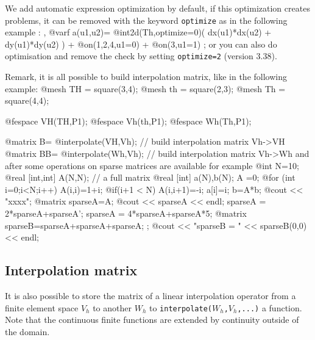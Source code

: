 \documentclass[a4paper,twoside,12pt]{book}
\def\x#1{#1\index{#1}}%
\def\n{\nabla}
\begin{document}
We add automatic \x{expression optimization} by default, if this optimization creates problems,
it can be removed with the keyword \texttt{{optimize}} as in the following example : ,
\bFF
@varf a(u1,u2)= @int2d(Th,optimize=0)(  dx(u1)*dx(u2) + dy(u1)*dy(u2) )
                    +  @on(1,2,4,u1=0)  +  @on(3,u1=1) ;
\eFF
or you can also  do optimisation and remove the check by setting  \verb!optimize=2! (version 3.38).

Remark, it is all possible to build interpolation matrix, like in
the following example:
\bFF
@mesh  TH = square(3,4);
@mesh  th = square(2,3);
@mesh  Th = square(4,4);


@fespace VH(TH,P1);
@fespace Vh(th,P1);
@fespace Wh(Th,P1);

@matrix B= @interpolate(VH,Vh);  // build interpolation matrix Vh->VH 
@matrix BB= @interpolate(Wh,Vh);  // build interpolation matrix  Vh->Wh 
\eFF 
and after some operations on sparse matrices are
available for example
 \bFF
  @int N=10;
  @real [int,int] A(N,N);  // a full matrix
  @real [int] a(N),b(N);
  A =0;
  @for (int i=0;i<N;i++)
    {
      A(i,i)=1+i;
      @if(i+1 < N)    A(i,i+1)=-i;
      a[i]=i;
    }
  b=A*b;
  @cout << "xxxx\n";
  @matrix sparseA=A;
  @cout << sparseA << endl;
  sparseA = 2*sparseA+sparseA';
  sparseA = 4*sparseA+sparseA*5; 
  @matrix sparseB=sparseA+sparseA+sparseA; ;
  @cout << "sparseB = " << sparseB(0,0) << endl;
\eFF


\subsection{Interpolation matrix}

It is also possible to store the matrix of a linear interpolation operator from
 a finite element space $V_h$ to  another $W_h$ to  \texttt{interpolate($W_h$,$V_h$,...)} a function.
Note that the continuous finite functions are extended by continuity
 outside of the domain.
	
\end{document}
